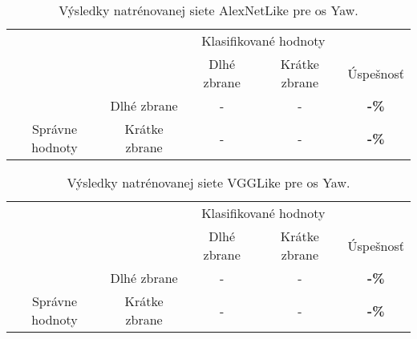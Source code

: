 \begin{table}[H]
    \centering
    \begin{tabular}{ccccc}
                                                                &                                    & \multicolumn{2}{c}{Klasifikované hodnoty}                                                         &                                    \\ \cline{3-5} 
                                                                & \multicolumn{1}{c|}{}              & \multicolumn{1}{c|}{Dlhé zbrane}                & \multicolumn{1}{c|}{Krátke zbrane}              & \multicolumn{1}{c|}{Úspešnosť}     \\ \cline{2-5} 
        \multicolumn{1}{c|}{}                                  & \multicolumn{1}{c|}{Dlhé zbrane}   & \multicolumn{1}{c|}{{\color[HTML]{009901} -}} & \multicolumn{1}{c|}{{\color[HTML]{9A0000} -}}  & \multicolumn{1}{c|}{\textbf{-\%}} \\ \cline{2-5} 
        \multicolumn{1}{c|}{\multirow{-2}{*}{Správne hodnoty}} & \multicolumn{1}{c|}{Krátke zbrane} & \multicolumn{1}{c|}{{\color[HTML]{9A0000} -}}  & \multicolumn{1}{c|}{{\color[HTML]{009901} -}} & \multicolumn{1}{c|}{\textbf{-\%}} \\ \cline{2-5} 
    \end{tabular}
    \caption{Výsledky natrénovanej siete AlexNetLike pre os Yaw.}
    \label{tab:alexnetyawresults}
\end{table}

\begin{table}[H]
    \centering
    \begin{tabular}{ccccc}
                                                                &                                    & \multicolumn{2}{c}{Klasifikované hodnoty}                                                         &                                    \\ \cline{3-5} 
                                                                & \multicolumn{1}{c|}{}              & \multicolumn{1}{c|}{Dlhé zbrane}                & \multicolumn{1}{c|}{Krátke zbrane}              & \multicolumn{1}{c|}{Úspešnosť}     \\ \cline{2-5} 
        \multicolumn{1}{c|}{}                                  & \multicolumn{1}{c|}{Dlhé zbrane}   & \multicolumn{1}{c|}{{\color[HTML]{009901} -}} & \multicolumn{1}{c|}{{\color[HTML]{9A0000} -}}  & \multicolumn{1}{c|}{\textbf{-\%}} \\ \cline{2-5} 
        \multicolumn{1}{c|}{\multirow{-2}{*}{Správne hodnoty}} & \multicolumn{1}{c|}{Krátke zbrane} & \multicolumn{1}{c|}{{\color[HTML]{9A0000} -}}  & \multicolumn{1}{c|}{{\color[HTML]{009901} -}} & \multicolumn{1}{c|}{\textbf{-\%}} \\ \cline{2-5} 
    \end{tabular}
    \caption{Výsledky natrénovanej siete VGGLike pre os Yaw.}
    \label{tab:vgglikeyawresults}
\end{table}

